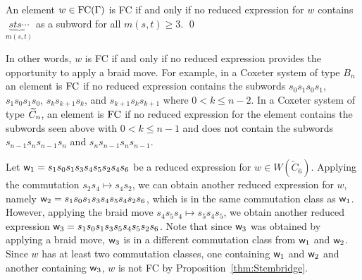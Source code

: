 \begin{proposition}\label{thm:Stembridge}
	An element $w \in \mathrm{FC}(\Gamma)$ is FC if and only if no reduced expression for $w$ contains $\underbrace{sts\cdots}_{m(s,t)}$ as a subword for all $m(s,t) \geq 3$. \qed
\end{proposition}

In other words, $w$ is FC if and only if no reduced expression provides the opportunity to apply a braid move. For example, in a Coxeter system of type $B_n$ an element is $\mathrm{FC}$ if no reduced expression contains the subwords $s_0s_1s_0s_1$, $s_1s_0s_1s_0$, $s_ks_{k+1}s_k$, and $s_{k+1}s_ks_{k+1}$ where $0<k\leq n-2$. In a Coxeter system of type $\widetilde{C}_n$, an element is $\mathrm{FC}$ if no reduced expression for the element contains the subwords seen above with $0<k\leq n-1$ and does not contain the subwords $s_{n-1}s_ns_{n-1}s_n$ and $s_{n}s_{n-1}s_ns_{n-1}$.


\begin{example}
Let $\mathsf{w}_1=s_1s_0s_1s_3s_4s_5s_2s_4s_6$ be a reduced expression for $w \in W(\widetilde{C}_6)$. Applying the commutation $s_2s_4 \mapsto s_4s_2$, we can obtain another reduced expression for $w$, namely $\mathsf{w}_2=s_1s_0s_1s_3s_4s_5s_4s_2s_6$, which is in the same commutation class as $\mathsf{w}_1$. However, applying the braid move $s_4s_5s_4 \mapsto s_5s_4s_5$, we obtain another reduced expression $\mathsf{w}_3=s_1s_0s_1s_3s_5s_4s_5s_2s_6$. Note that since $\mathsf{w}_3$ was obtained by applying a braid move, $\mathsf{w}_3$ is in a different commutation class from $\mathsf{w}_1$ and $\mathsf{w}_2$. Since $w$ has at least two commutation classes, one containing $\mathsf{w}_1$ and $\mathsf{w}_2$ and another containing $\mathsf{w}_3$, $w$ is not FC by Proposition~\ref{thm:Stembridge}.
\end{example}


